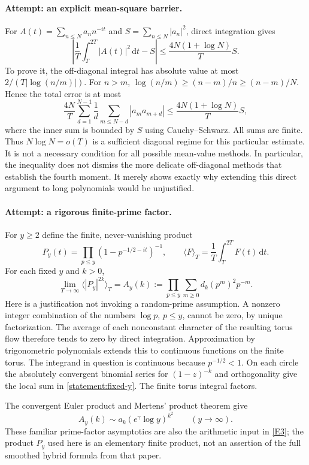 \documentclass[11pt,a4paper]{article}
\newcommand{\dd}{\,\mathrm d}
\newcommand{\eref}[2]{\hyperlink{extra:#1:#2}{[E#2]}}
\numberwithin{equation}{section}
\begin{document}
\paragraph{Attempt: an explicit mean-square barrier.}
For $A(t)=\sum_{n\le N}a_n n^{-it}$ and
$S=\sum_{n\le N}|a_n|^2$, direct integration gives
\begin{equation}\label{statement:mean-square}
 \left|\frac1T\int_T^{2T}|A(t)|^2\dd t-S\right|
 \le\frac{4N(1+\log N)}{T}S.
\end{equation}
To prove it, the off-diagonal integral has absolute value at most
$2/(T|\log(n/m)|)$. For $n>m$,
$\log(n/m)\ge(n-m)/n\ge(n-m)/N$. Hence the total error is at most
\[
 \frac{4N}{T}\sum_{d=1}^{N-1}\frac1d
       \sum_{m\le N-d}|a_ma_{m+d}|
 \le \frac{4N(1+\log N)}{T}S,
\]
where the inner sum is bounded by $S$ using Cauchy--Schwarz. All sums
are finite. Thus $N\log N=o(T)$ is a sufficient diagonal regime for this
particular estimate. It is not a necessary condition for all possible
mean-value methods. In particular, the inequality does not dismiss the
more delicate off-diagonal methods that establish the fourth moment.
It merely shows exactly why extending this direct argument to long
polynomials would be unjustified.

\paragraph{Attempt: a rigorous finite-prime factor.}
For $y\ge2$ define the finite, never-vanishing product
\[
 P_y(t)=\prod_{p\le y}(1-p^{-1/2-it})^{-1},\qquad
 \langle F\rangle_T=\frac1T\int_T^{2T}F(t)\dd t.
\]
For each fixed $y$ and $k>0$,
\begin{equation}\label{statement:fixed-y}
 \lim_{T\to\infty}\langle|P_y|^{2k}\rangle_T
 =A_y(k):=\prod_{p\le y}\sum_{m\ge0}d_k(p^m)^2p^{-m}.
\end{equation}
Here is a justification not invoking a random-prime assumption. A nonzero
integer combination of the numbers $\log p$, $p\le y$, cannot be zero,
by unique factorization. The average of each nonconstant character of
the resulting torus flow therefore tends to zero by direct integration.
Approximation by trigonometric polynomials extends this to continuous
functions on the finite torus. The integrand in question is continuous
because $p^{-1/2}<1$. On each circle the absolutely convergent binomial
series for $(1-z)^{-k}$ and orthogonality give the local sum in
\eqref{statement:fixed-y}. The finite torus integral factors.

The convergent Euler product and Mertens' product theorem give
\begin{equation}\label{statement:Ay}
 A_y(k)\sim a_k(e^\gamma\log y)^{k^2}
 \qquad(y\to\infty).
\end{equation}
These familiar prime-factor asymptotics are also the arithmetic input in
\eref{statement}{3}; the product $P_y$ used here is an elementary finite product,
not an assertion of the full smoothed hybrid formula from that paper.
\end{document}
